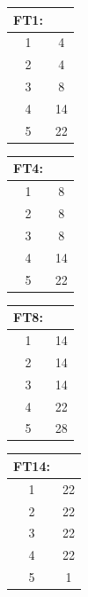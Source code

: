 \documentclass{article}
\begin{document}
        
   \begin{table}[H]
       
  
        
              \centering
              \begin{tabular}{|c|c|}
                  \hline
                   FT1:& \\
                   \hline
                   1&4\\
                   \hline
                   2&4\\
                   \hline
                   3&8\\
                   \hline
                   4&14\\
                   \hline
                   5&22\\
                   \hline
               \end{tabular}
  
             \centering
             \begin{tabular}{|c|c|}
                 \hline
                 FT4:& \\
                 \hline
                 1&8\\
                 \hline
                 2&8\\
                 \hline
                 3&8\\
                 \hline
                 4&14\\
                 \hline
                 5&22\\
                 \hline
             \end{tabular}


           \centering
           \begin{tabular}{|c|c|}
               \hline
               FT8:& \\
               \hline
               1&14\\
               \hline
               2&14\\
               \hline
               3&14\\
               \hline
               4&22\\
               \hline
               5&28\\
               \hline
           \end{tabular}
   





        
     
           \centering
           \begin{tabular}{|c|c|}
               \hline
               FT14:& \\
               \hline
               1&22\\
               \hline
               2&22\\
               \hline
               3&22\\
               \hline
               4&22\\
               \hline
               5&1\\
               \hline
           \end{tabular}


\end{table}
\end{document}
